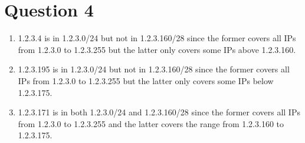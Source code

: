 \documentclass[12pt]{article}
\begin{document}

\section{Question 4} %
\label{sec:question_4}

\begin{enumerate}
\item 1.2.3.4 is in 1.2.3.0/24 but not in 1.2.3.160/28 since the former covers all IPs from 1.2.3.0 to 1.2.3.255 but the latter only covers some IPs above 1.2.3.160.
\item 1.2.3.195 is in 1.2.3.0/24 but not in 1.2.3.160/28 since the former covers all IPs from 1.2.3.0 to 1.2.3.255 but the latter only covers some IPs below 1.2.3.175.
\item 1.2.3.171 is in both 1.2.3.0/24 and 1.2.3.160/28 since the former covers all IPs from 1.2.3.0 to 1.2.3.255 and the latter covers the range from 1.2.3.160 to 1.2.3.175.
\end{enumerate}

\end{document}
